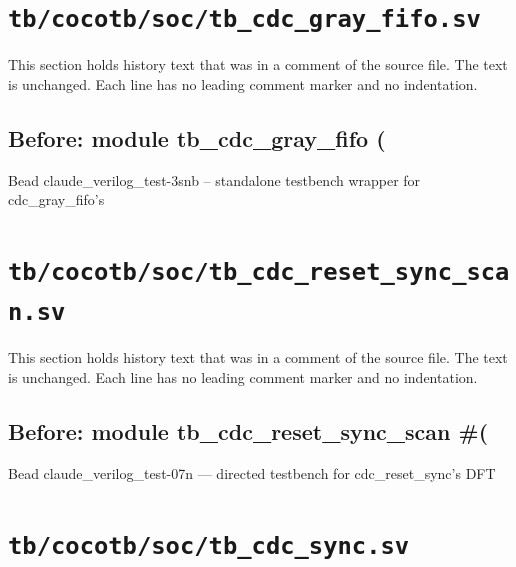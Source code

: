 \section{\texttt{tb/cocotb/soc/tb\_cdc\_gray\_fifo.sv}}\label{cr:suite:soc-tb-cdc-gray-fifo-sv}

This section holds history text that was in a comment of the source file. The text is unchanged. Each line has no leading comment marker and no indentation.

\begin{record}

\subsection*{Before: module tb\_cdc\_gray\_fifo (}

\begin{textblock}
Bead claude_verilog_test-3snb -- standalone testbench wrapper for cdc_gray_fifo's
\end{textblock}

\end{record}

\section{\texttt{tb/cocotb/soc/tb\_cdc\_reset\_sync\_scan.sv}}\label{cr:suite:soc-tb-cdc-reset-sync-scan-sv}

This section holds history text that was in a comment of the source file. The text is unchanged. Each line has no leading comment marker and no indentation.

\begin{record}

\subsection*{Before: module tb\_cdc\_reset\_sync\_scan \#(}

\begin{textblock}
Bead claude_verilog_test-07n — directed testbench for cdc_reset_sync's DFT
\end{textblock}

\end{record}

\section{\texttt{tb/cocotb/soc/tb\_cdc\_sync.sv}}\label{cr:suite:soc-tb-cdc-sync-sv}

